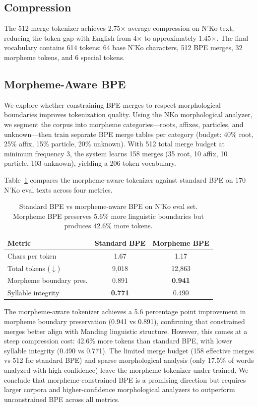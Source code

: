 \documentclass[11pt]{article}
\begin{document}
\subsection{Compression}

The 512-merge tokenizer achieves 2.75$\times$ average compression on N'Ko text, reducing the token gap with English from 4$\times$ to approximately 1.45$\times$.
The final vocabulary contains 614 tokens: 64 base N'Ko characters, 512 BPE merges, 32 morpheme tokens, and 6 special tokens.

\subsection{Morpheme-Aware BPE}

We explore whether constraining BPE merges to respect morphological boundaries improves tokenization quality.
Using the NKo morphological analyzer, we segment the corpus into morpheme categories---roots, affixes, particles, and unknown---then train separate BPE merge tables per category (budget: 40\% root, 25\% affix, 15\% particle, 20\% unknown).
With 512 total merge budget at minimum frequency 3, the system learns 158 merges (35 root, 10 affix, 10 particle, 103 unknown), yielding a 206-token vocabulary.

Table~\ref{tab:morpheme-bpe} compares the morpheme-aware tokenizer against standard BPE on 170 N'Ko eval texts across four metrics.

\begin{table}[t]
\centering
\small
\begin{tabular}{lcc}
\toprule
\textbf{Metric} & \textbf{Standard BPE} & \textbf{Morpheme BPE} \\
\midrule
Chars per token & 1.67 & 1.17 \\
Total tokens ($\downarrow$) & 9,018 & 12,863 \\
Morpheme boundary pres. & 0.891 & \textbf{0.941} \\
Syllable integrity & \textbf{0.771} & 0.490 \\
\bottomrule
\end{tabular}
\caption{Standard BPE vs morpheme-aware BPE on N'Ko eval set. Morpheme BPE preserves 5.6\% more linguistic boundaries but produces 42.6\% more tokens.}
\label{tab:morpheme-bpe}
\end{table}

The morpheme-aware tokenizer achieves a 5.6 percentage point improvement in morpheme boundary preservation (0.941 vs 0.891), confirming that constrained merges better align with Manding linguistic structure.
However, this comes at a steep compression cost: 42.6\% more tokens than standard BPE, with lower syllable integrity (0.490 vs 0.771).
The limited merge budget (158 effective merges vs 512 for standard BPE) and sparse morphological analysis (only 17.5\% of words analyzed with high confidence) leave the morpheme tokenizer under-trained.
We conclude that morpheme-constrained BPE is a promising direction but requires larger corpora and higher-confidence morphological analyzers to outperform unconstrained BPE across all metrics.
\end{document}
